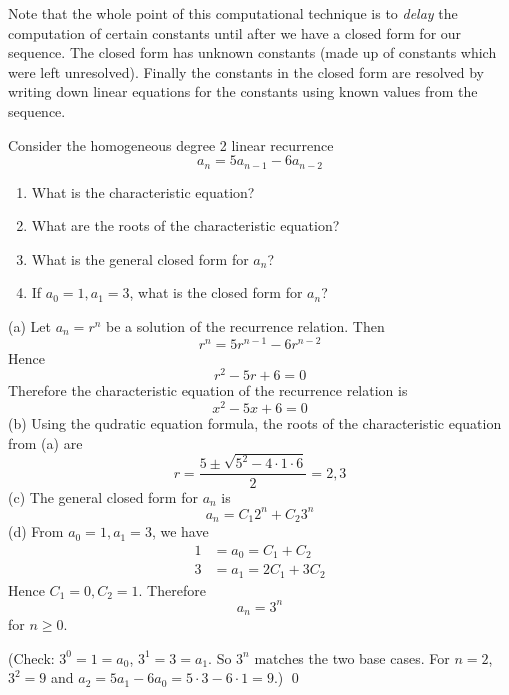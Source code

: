 Note that the whole point of this computational technique is to 
\textit{delay} the computation of certain constants until after we have
a closed form for our sequence.
The closed form has unknown constants (made up of constants
which were left unresolved).
Finally the constants in the closed form are resolved by writing
down linear equations for the constants using
known values from the sequence.

\begin{eg}
  Consider the homogeneous degree 2 linear recurrence
  \[
  a_n = 5a_{n-1} - 6a_{n-2}
  \]
  \begin{enumerate}[nosep,label=(\alph*)]
  \item What is the characteristic equation?
  \item What are the roots of the characteristic equation?
  \item What is the general closed form for $a_n$?
  \item If $a_0 = 1, a_1 = 3$, what is the closed form for $a_n$?
  \end{enumerate}
\end{eg}
\SOLUTION
(a) Let $a_n = r^n$ be a solution of the recurrence relation.
Then
\[
r^n = 5 r^{n-1} - 6 r^{n-2}
\]
Hence
\[
r^2 - 5 r + 6 = 0
\]
Therefore the characteristic equation of the recurrence relation
is
\[
x^2 - 5x + 6 = 0
\]
(b)
Using the qudratic equation formula,
the roots of the characteristic equation from (a) are
\[
r = \frac{5 \pm \sqrt{5^2 - 4 \cdot 1 \cdot 6}}{2} = 2, 3
\]
(c)
The general closed form for $a_n$ is
\[
a_n = C_1 2^n + C_2 3^n
\]
(d)
From $a_0 = 1, a_1 = 3$, we have
\begin{align*}
  1 &= a_0 = C_1 + C_2 \\
  3 &= a_1 = 2C_1 + 3C_2 
\end{align*}
Hence $C_1 = 0, C_2 = 1$.
Therefore
\[
a_n = 3^n
\]
for $n \geq 0$.

(Check: $3^0 = 1 = a_0$, $3^1 = 3 = a_1$. So $3^n$ matches
the two base cases.
For $n = 2$,
$3^2 = 9$ and $a_2 = 5a_{1} - 6a_{0} = 5 \cdot 3 - 6 \cdot 1 = 9$.)
\qed



